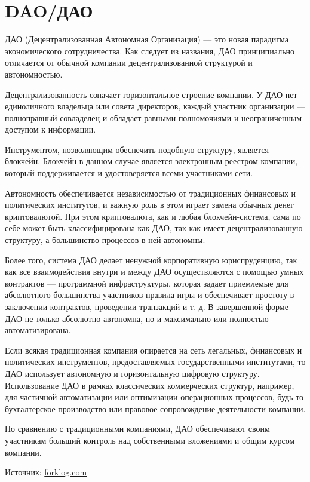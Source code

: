 \documentclass[a4paper,12pt]{report}
\begin{document}
\section{DAO/ДАО}
\label{dao}

ДАО (Децентрализованная Автономная Организация) — это новая парадигма экономического сотрудничества. Как следует из названия, ДАО принципиально отличается от обычной компании децентрализованной структурой и автономностью.

Децентрализованность означает горизонтальное строение компании. У ДАО нет единоличного владельца или совета директоров, каждый участник организации — полноправный совладелец и обладает равными полномочиями и неограниченным доступом к информации.

Инструментом, позволяющим обеспечить подобную структуру, является блокчейн. Блокчейн в данном случае является электронным реестром компании, который поддерживается и удостоверяется всеми участниками сети.

Автономность обеспечивается независимостью от традиционных финансовых и политических институтов, и важную роль в этом играет замена обычных денег криптовалютой. При этом криптовалюта, как и любая блокчейн-система, сама по себе может быть классифицирована как ДАО, так как имеет децентрализованную структуру, а большинство процессов в ней автономны.

Более того, система ДАО делает ненужной корпоративную юриспруденцию, так как все взаимодействия внутри и между ДАО осуществляются с помощью умных контрактов — программной инфраструктуры, которая задает приемлемые для абсолютного большинства участников правила игры и обеспечивает простоту в заключении контрактов, проведении транзакций и т. д. В завершенной форме ДАО не только абсолютно автономна, но и максимально или полностью автоматизирована.

Если всякая традиционная компания опирается на сеть легальных, финансовых и политических инструментов, предоставляемых государственными институтами, то ДАО использует автономную и горизонтальную цифровую структуру. Использование ДАО в рамках классических коммерческих структур, например, для частичной автоматизации или оптимизации операционных процессов, будь то бухгалтерское производство или правовое сопровождение деятельности компании.

По сравнению с традиционными компаниями, ДАО обеспечивают своим участникам больший контроль над собственными вложениями и общим курсом компании. 

Источник: \href{https://forklog.com/chto-takoe-detsentralizovannye-avtonomnye-organizatsii-i-zachem-oni-nuzhny/}{forklog.com}
\end{document}
